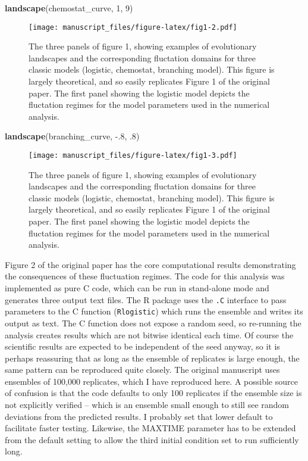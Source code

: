 \documentclass[
]{rescience}
\newenvironment{Shaded}{\begin{snugshade}}{\end{snugshade}}
\newcommand{\DecValTok}[1]{\textcolor[rgb]{0.00,0.00,0.81}{#1}}
\newcommand{\FloatTok}[1]{\textcolor[rgb]{0.00,0.00,0.81}{#1}}
\newcommand{\KeywordTok}[1]{\textcolor[rgb]{0.13,0.29,0.53}{\textbf{#1}}}
\newcommand{\NormalTok}[1]{#1}
\begin{document}
\begin{Shaded}
\begin{Highlighting}[]
\KeywordTok{landscape}\NormalTok{(chemostat_curve, }\DecValTok{1}\NormalTok{, }\DecValTok{9}\NormalTok{)}
\end{Highlighting}
\end{Shaded}

\begin{figure}
\centering
\texttt{[image: manuscript\_files/figure-latex/fig1-2.pdf]}
\caption{The three panels of figure 1, showing examples of evolutionary
landscapes and the corresponding fluctation domains for three classic
models (logistic, chemostat, branching model). This figure is largely
theoretical, and so easily replicates Figure 1 of the original paper.
The first panel showing the logistic model depicts the fluctation
regimes for the model parameters used in the numerical analysis.}
\end{figure}

\begin{Shaded}
\begin{Highlighting}[]
\KeywordTok{landscape}\NormalTok{(branching_curve, }\FloatTok{-.8}\NormalTok{, }\FloatTok{.8}\NormalTok{)}
\end{Highlighting}
\end{Shaded}

\begin{figure}
\centering
\texttt{[image: manuscript\_files/figure-latex/fig1-3.pdf]}
\caption{The three panels of figure 1, showing examples of evolutionary
landscapes and the corresponding fluctation domains for three classic
models (logistic, chemostat, branching model). This figure is largely
theoretical, and so easily replicates Figure 1 of the original paper.
The first panel showing the logistic model depicts the fluctation
regimes for the model parameters used in the numerical analysis.}
\end{figure}

Figure 2 of the original paper has the core computational results
demonstrating the consequences of these fluctuation regimes. The code
for this analysis was implemented as pure C code, which can be run in
stand-alone mode and generates three output text files. The R package
uses the \texttt{.C} interface to pass parameters to the C function
(\texttt{Rlogistic}) which runs the ensemble and writes its output as
text. The C function does not expose a random seed, so re-running the
analysis creates results which are not bitwise identical each time. Of
course the scientific results are expected to be independent of the seed
anyway, so it is perhaps reassuring that as long as the ensemble of
replicates is large enough, the same pattern can be reproduced quite
closely. The original manuscript uses ensembles of 100,000 replicates,
which I have reproduced here. A possible source of confusion is that the
code defaults to only 100 replicates if the ensemble size is not
explicitly verified -- which is an ensemble small enough to still see
random deviations from the predicted results. I probably set that lower
default to facilitate faster testing. Likewise, the MAXTIME parameter
has to be extended from the default setting to allow the third initial
condition set to run sufficiently long.
\end{document}
